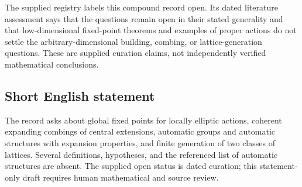 \documentclass[11pt]{article}
\begin{document}
The supplied registry labels this compound record open. Its dated literature assessment says that the questions remain open in their stated generality and that low-dimensional fixed-point theorems and examples of proper actions do not settle the arbitrary-dimensional building, combing, or lattice-generation questions. These are supplied curation claims, not independently verified mathematical conclusions.
\subsection{Short English statement}
The record asks about global fixed points for locally elliptic actions, coherent expanding combings of central extensions, automatic groups and automatic structures with expansion properties, and finite generation of two classes of lattices. Several definitions, hypotheses, and the referenced list of automatic structures are absent. The supplied open status is dated curation; this statement-only draft requires human mathematical and source review.
\end{document}
